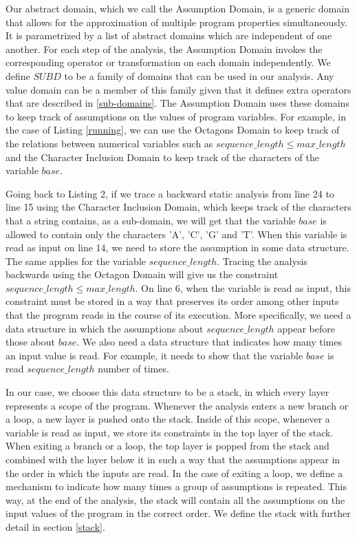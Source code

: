 \documentclass[10pt]{report}
\begin{document}
Our abstract domain, which we call the Assumption Domain, is a generic domain that allows for the approximation of multiple program properties simultaneously. It is parametrized by a list of abstract domains which are independent of one another. For each step of the analysis, the Assumption Domain invokes the corresponding operator or transformation on each domain independently. We define $ SUBD $ to be a family of domains that can be used in our analysis. Any value domain can be a member of this family given that it defines extra operators that are described in \ref{sub-domains}. The Assumption Domain uses these domains to keep track of assumptions on the values of program variables. For example, in the case of Listing \ref{running}, we can use the Octagons Domain \cite{octagon} to keep track of the relations between numerical variables such as $sequence\_length \leq max\_length$ and the Character Inclusion Domain \cite{character} to keep track of the characters of the variable $base$.

Going back to Listing 2, if we trace a backward static analysis from line 24 to line 15 using the Character Inclusion Domain, which keeps track of the characters that a string contains, as a sub-domain, we will get that the variable $ base $ is allowed to contain only the characters 'A', 'C', 'G' and 'T'. When this variable is read as input on line 14, we need to store the assumption in some data structure. The same applies for the variable $ sequence\_length $. Tracing the analysis backwards using the Octagon Domain will give us the constraint $ sequence\_length \leq max\_length $. On line 6, when the variable is read as input, this constraint must be stored in a way that preserves its order among other inputs that the program reads in the course of its execution. More specifically, we need a data structure in which the assumptions about $ sequence\_length$ appear before those about $ base $.  We also need a data structure that indicates how many times an input value is read. For example, it needs to show that the variable $ base $ is read $ sequence\_length $ number of times. 

In our case, we choose this data structure to be a stack, in which every layer represents a scope of the program. Whenever the analysis enters a new branch or a loop, a new layer is pushed onto the stack. Inside of this scope, whenever a variable is read as input, we store its constraints in the top layer of the stack. When exiting a branch or a loop, the top layer is popped from the stack and combined with the layer below it in such a way that the assumptions appear in the order in which the inputs are read. In the case of exiting a loop, we define a mechanism to indicate how many times a group of assumptions is repeated. This way, at the end of the analysis, the stack will contain all the assumptions on the input values of the program in the correct order. We define the stack with further detail in section \ref{stack}. 
\end{document}
